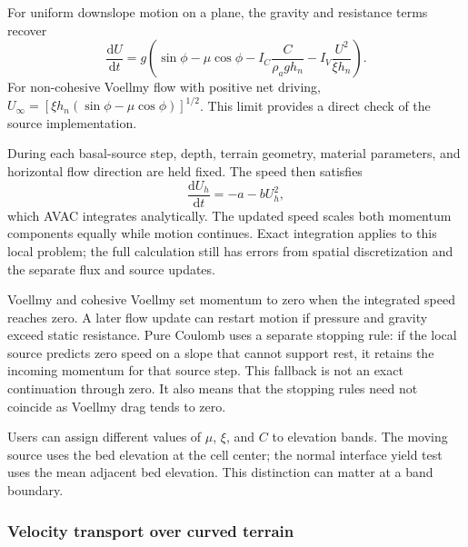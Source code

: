 \documentclass[11pt,a4paper]{article}
\begin{document}
For uniform downslope motion on a plane, the gravity and resistance terms
recover
\begin{equation}
  \frac{\mathrm dU}{\mathrm dt}
  =g\left(\sin\phi-\mu\cos\phi
   -I_C\frac{C}{\rho_a g h_n}
   -I_V\frac{U^2}{\xi h_n}\right).
  \label{eq:avac-planar-voellmy}
\end{equation}
For non-cohesive Voellmy flow with positive net driving,
$U_\infty=[\xi h_n(\sin\phi-\mu\cos\phi)]^{1/2}$.
This limit provides a direct check of the source implementation.

During each basal-source step, depth, terrain geometry, material parameters,
and horizontal flow direction are held fixed. The speed then satisfies
\begin{equation}
  \frac{\mathrm dU_h}{\mathrm dt}=-a-bU_h^2,
  \label{eq:avac-speed-ode}
\end{equation}
which AVAC integrates analytically. The updated speed scales both momentum
components equally while motion continues. Exact integration applies to this
local problem; the full calculation still has errors from spatial
discretization and the separate flux and source updates.

Voellmy and cohesive Voellmy set momentum to zero when the integrated speed
reaches zero. A later flow update can restart motion if pressure and gravity
exceed static resistance. Pure Coulomb uses a separate stopping rule: if the
local source predicts zero speed on a slope that cannot support rest, it
retains the incoming momentum for that source step. This fallback is not an
exact continuation through zero. It also means that the stopping rules need
not coincide as Voellmy drag tends to zero.

Users can assign different values of $\mu$, $\xi$, and $C$ to elevation bands.
The moving source uses the bed elevation at the cell center; the normal
interface yield test uses the mean adjacent bed elevation. This distinction
can matter at a band boundary.

\subsubsection{Velocity transport over curved terrain}
\end{document}
